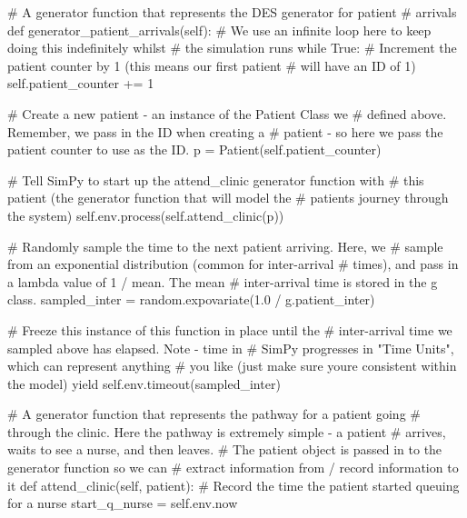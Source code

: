 \documentclass[
  letterpaper,
  DIV=11,
  numbers=noendperiod]{scrreprt}
\newenvironment{Shaded}{\begin{snugshade}}{\end{snugshade}}
\newcommand{\CommentTok}[1]{\textcolor[rgb]{0.37,0.37,0.37}{#1}}
\newcommand{\ControlFlowTok}[1]{\textcolor[rgb]{0.00,0.23,0.31}{#1}}
\newcommand{\DecValTok}[1]{\textcolor[rgb]{0.68,0.00,0.00}{#1}}
\newcommand{\FloatTok}[1]{\textcolor[rgb]{0.68,0.00,0.00}{#1}}
\newcommand{\KeywordTok}[1]{\textcolor[rgb]{0.00,0.23,0.31}{#1}}
\newcommand{\NormalTok}[1]{\textcolor[rgb]{0.00,0.23,0.31}{#1}}
\newcommand{\OperatorTok}[1]{\textcolor[rgb]{0.37,0.37,0.37}{#1}}
\newcommand{\VariableTok}[1]{\textcolor[rgb]{0.07,0.07,0.07}{#1}}
\begin{document}
\begin{Shaded}
\begin{Highlighting}[]
    \CommentTok{\# A generator function that represents the DES generator for patient}
    \CommentTok{\# arrivals}
    \KeywordTok{def}\NormalTok{ generator\_patient\_arrivals(}\VariableTok{self}\NormalTok{):}
        \CommentTok{\# We use an infinite loop here to keep doing this indefinitely whilst}
        \CommentTok{\# the simulation runs}
        \ControlFlowTok{while} \VariableTok{True}\NormalTok{:}
            \CommentTok{\# Increment the patient counter by 1 (this means our first patient}
            \CommentTok{\# will have an ID of 1)}
            \VariableTok{self}\NormalTok{.patient\_counter }\OperatorTok{+=} \DecValTok{1}

            \CommentTok{\# Create a new patient {-} an instance of the Patient Class we}
            \CommentTok{\# defined above.  Remember, we pass in the ID when creating a}
            \CommentTok{\# patient {-} so here we pass the patient counter to use as the ID.}
\NormalTok{            p }\OperatorTok{=}\NormalTok{ Patient(}\VariableTok{self}\NormalTok{.patient\_counter)}

            \CommentTok{\# Tell SimPy to start up the attend\_clinic generator function with}
            \CommentTok{\# this patient (the generator function that will model the}
            \CommentTok{\# patient\textquotesingle{}s journey through the system)}
            \VariableTok{self}\NormalTok{.env.process(}\VariableTok{self}\NormalTok{.attend\_clinic(p))}

            \CommentTok{\# Randomly sample the time to the next patient arriving.  Here, we}
            \CommentTok{\# sample from an exponential distribution (common for inter{-}arrival}
            \CommentTok{\# times), and pass in a lambda value of 1 / mean.  The mean}
            \CommentTok{\# inter{-}arrival time is stored in the g class.}
\NormalTok{            sampled\_inter }\OperatorTok{=}\NormalTok{ random.expovariate(}\FloatTok{1.0} \OperatorTok{/}\NormalTok{ g.patient\_inter)}

            \CommentTok{\# Freeze this instance of this function in place until the}
            \CommentTok{\# inter{-}arrival time we sampled above has elapsed.  Note {-} time in}
            \CommentTok{\# SimPy progresses in "Time Units", which can represent anything}
            \CommentTok{\# you like (just make sure you\textquotesingle{}re consistent within the model)}
            \ControlFlowTok{yield} \VariableTok{self}\NormalTok{.env.timeout(sampled\_inter)}

    \CommentTok{\# A generator function that represents the pathway for a patient going}
    \CommentTok{\# through the clinic.  Here the pathway is extremely simple {-} a patient}
    \CommentTok{\# arrives, waits to see a nurse, and then leaves.}
    \CommentTok{\# The patient object is passed in to the generator function so we can}
    \CommentTok{\# extract information from / record information to it}
    \KeywordTok{def}\NormalTok{ attend\_clinic(}\VariableTok{self}\NormalTok{, patient):}
        \CommentTok{\# Record the time the patient started queuing for a nurse}
\NormalTok{        start\_q\_nurse }\OperatorTok{=} \VariableTok{self}\NormalTok{.env.now}


\end{Highlighting}
\end{Shaded}
\end{document}
